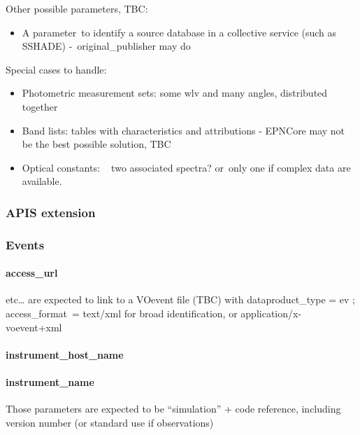 \documentclass[11pt,a4paper]{ivoa}
\begin{document}
Other possible parameters, TBC:

\begin{itemize}
\item A parameter to identify a source database in a collective service (such as SSHADE) - original\_publisher may do
\end{itemize}

Special cases to handle:

\begin{itemize}
\item Photometric measurement sets: some wlv and many angles, distributed together
\item Band lists: tables with characteristics and attributions - EPNCore may not be the best possible solution, TBC
\item Optical constants: ~ two associated spectra? or only one if complex data are available.
\end{itemize}

\subsubsection{APIS extension\\}

\subsubsection{Events\\}

\paragraph{access\_url\textbf{ }}

etc… are expected to link to a VOevent file (TBC) with dataproduct\_type = ev ; access\_format = text/xml for broad identification, or application/x-voevent+xml 

\paragraph{instrument\_host\_name}

\paragraph{instrument\_name}

Those parameters are expected to be ``simulation'' + code reference, including version number (or standard use if observations)
\end{document}
